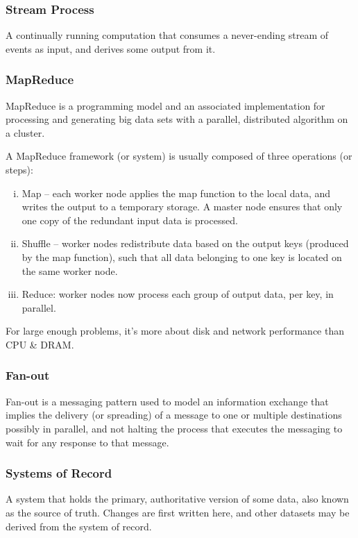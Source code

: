 \documentclass{article}
\begin{document}
    \subsubsection{Stream Process}
    A continually running computation that consumes a never-ending stream of events as input, and derives some output from it.
    
    \subsubsection{MapReduce}
    MapReduce is a programming model and an associated implementation for processing and generating big data sets with a parallel, distributed algorithm on a cluster.
    
    A MapReduce framework (or system) is usually composed of three operations (or steps):
    \begin{enumerate}[i.]
        \item Map -- each worker node applies the map function to the local data, and writes the output to a temporary storage. A master node ensures that only one copy of the redundant input data is processed.
        \item Shuffle -- worker nodes redistribute data based on the output keys (produced by the map function), such that all data belonging to one key is located on the same worker node.
        \item Reduce: worker nodes now process each group of output data, per key, in parallel.
    \end{enumerate}

    For large enough problems, it’s more about disk and network performance than CPU \& DRAM.
    
    \subsubsection{Fan-out}
    Fan-out is a messaging pattern used to model an information exchange that implies the delivery (or spreading) of a message to one or multiple destinations possibly in parallel, and not halting the process that executes the messaging to wait for any response to that message.
    
    \subsubsection{Systems of Record}
    A system that holds the primary, authoritative version of some data, also known as  the source of truth. Changes are first written here, and other datasets may be derived from the system of record.
    
\end{document}
